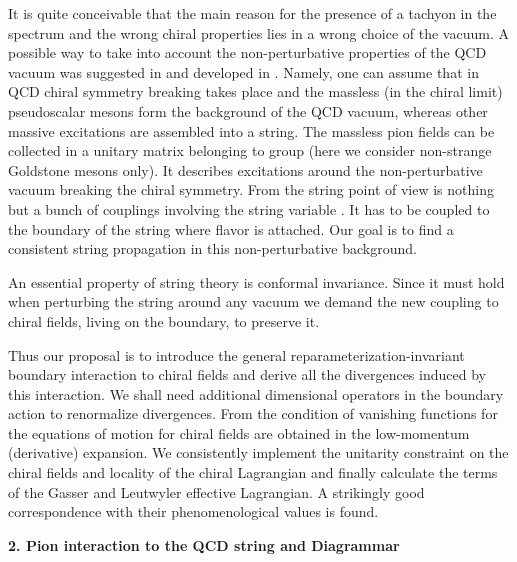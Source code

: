 \documentclass[a4paper,12pt]{article}
\begin{document}
It is quite conceivable that the main reason for the
presence of a tachyon in the spectrum and the wrong chiral
properties lies in a wrong choice
of the vacuum\cite{tachyon}.
A possible way to take into account the non-perturbative properties
 of the QCD vacuum 
was suggested in \cite{ADE} and developed in \cite{aabe}. Namely, one can assume
that in QCD chiral symmetry breaking takes place and
the massless (in the chiral limit) pseudoscalar mesons form the background
of the QCD vacuum,
whereas other massive excitations are assembled into a string.
The massless pion fields can be collected in a
unitary matrix \coordHE{} belonging to \coordHE{} group (here we 
consider non-strange Goldstone mesons only). It describes excitations
around the non-perturbative vacuum breaking the chiral symmetry. From the 
string point of view
\coordHE{} is nothing but a
bunch of couplings involving the string variable \coordHE{}. 
It has to be coupled to the
boundary of the string where flavor is attached.
Our goal is to find
a consistent string propagation in this non-perturbative background.

An essential property of string theory is conformal invariance. 
Since it must hold when 
perturbing the string around any vacuum we demand the new coupling to
chiral fields, living on the boundary, to preserve it.

Thus our proposal is to introduce the general reparameterization-invariant
boundary interaction to chiral fields and derive all the divergences induced by
this interaction. We shall need additional dimensional operators
 in the boundary action to renormalize divergences. 
From the condition of vanishing \myHighlight{$\beta$}\coordHE{} functions for \coordHE{}
the equations of motion for chiral fields are obtained in the low-momentum 
(derivative)
expansion. We consistently implement the unitarity constraint on the 
chiral fields 
and locality of the chiral
Lagrangian and finally calculate the \coordHE{} terms of 
the Gasser and Leutwyler\cite{GL} 
effective Lagrangian. A strikingly good correspondence
with their phenomenological values is found.\\

\centerline{\large\bf 2. Pion interaction to the QCD string and Diagrammar}

\medskip
\end{document}
